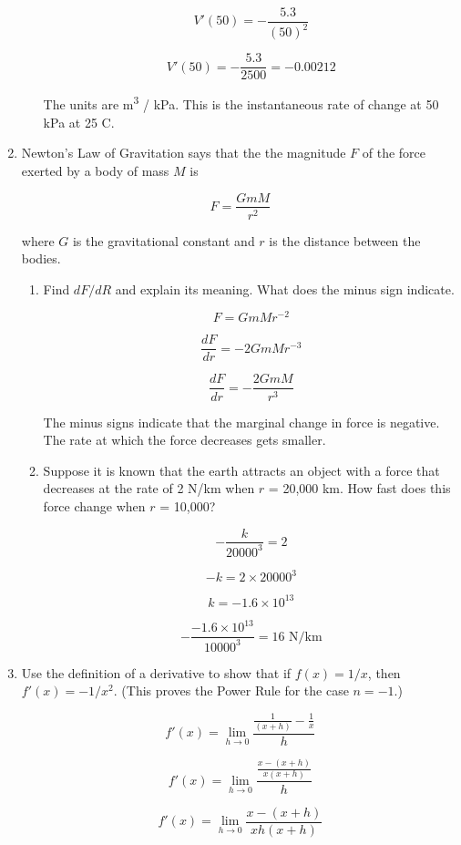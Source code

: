 \documentclass{article}
\begin{document}
\begin{enumerate}
\begin{enumerate}
				$$V'(50) = - \frac{5.3}{(50)^2}$$

				$$V'(50) = - \frac{5.3}{2500} = - 0.00212$$

				The units are m\textsuperscript{3} / kPa. This is the instantaneous rate of change at
				50 kPa at 25 \degree C.
		\end{enumerate}

			\item Newton's Law of Gravitation says that the the magnitude $F$ of the force exerted by a body
				of mass $M$ is 

				$$F = \frac{GmM}{r^2}$$

				where $G$ is the gravitational constant and $r$ is the distance between the bodies.

			\begin{enumerate}
				\item Find $dF/dR$ and explain its meaning. What does the minus sign indicate.

					$$F = GmMr^{-2}$$

					$$\frac{dF}{dr} = -2GmMr^{-3}$$

					$$\frac{dF}{dr} = - \frac{2GmM}{r^3}$$

					The minus signs indicate that the marginal change in force is negative. The rate at
					which the force decreases gets smaller.

				\item Suppose it is known that the earth attracts an object with a force that decreases at the
					rate of 2 N/km when $r$ = 20,000 km. How fast does this force change when $r$ = 10,000?

					$$- \frac{k}{20000^{3}} = 2$$

					$$- k = 2 \times 20000^{3}$$

					$$k = - 1.6 \times 10^{13}$$

					$$- \frac{-1.6 \times 10^{13}}{10000^{3}} = 16 \text{ N/km}$$
			\end{enumerate}

			\item Use the definition of a derivative to show that if $f(x) = 1/x$, then $f'(x) = - 1/x^2$. (This proves
				the Power Rule for the case $n = -1$.)

				$$f'(x) = \lim \limits _{h \to 0} \frac{ \frac{1}{(x+h)} - \frac{1}{x} }{h}$$

				$$f'(x) = \lim \limits _{h \to 0} \frac{ \frac{x - (x+h)}{x(x+h)} }{h}$$

				$$f'(x) = \lim \limits _{h \to 0} \frac{x - (x+h)}{xh(x+h)}$$


\end{enumerate}
\end{document}
